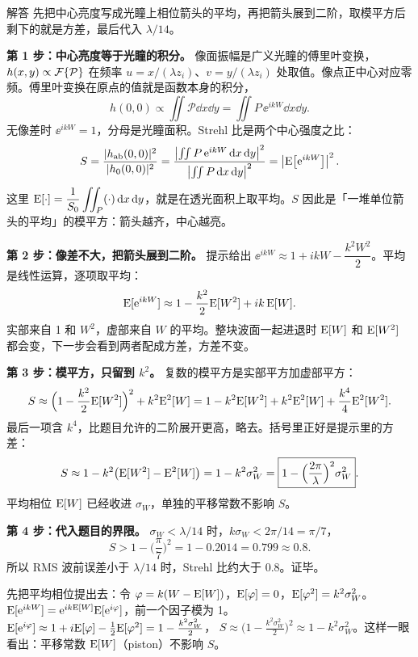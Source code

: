\begin{exam}{解答}
先把中心亮度写成光瞳上相位箭头的平均，再把箭头展到二阶，取模平方后剩下的就是方差，最后代入 $\lambda/14$。

\textbf{第 1 步：中心亮度等于光瞳的积分。}
像面振幅是广义光瞳的傅里叶变换，$h(x,y)\propto\mathcal{F}\{\mathcal P\}$ 在频率 $u=x/(\lambda z_i)$、$v=y/(\lambda z_i)$ 处取值。像点正中心对应零频。傅里叶变换在原点的值就是函数本身的积分，
\[
h(0,0)\propto\iint\mathcal P\dd x\dd y=\iint P\,\ee^{ikW}\dd x\dd y .
\]
无像差时 $\ee^{ikW}=1$，分母是光瞳面积。Strehl 比是两个中心强度之比：
\[
S=\frac{|h_{\text{ab}}(0,0)|^2}{|h_0(0,0)|^2}
=\frac{\left|\iint P\,\mathrm{e}^{ikW}\,\mathrm{d} x\,\mathrm{d} y\right|^2}{\left|\iint P\,\mathrm{d} x\,\mathrm{d} y\right|^2}
=\left|\mathrm{E}\!\left[\mathrm{e}^{ikW}\right]\right|^2 .
\]
这里 $\mathrm{E}[\cdot]=\dfrac1{S_0}\displaystyle\iint_P(\cdot)\,\mathrm{d} x\,\mathrm{d} y$，就是在透光面积上取平均。$S$ 因此是「一堆单位箭头的平均」的模平方：箭头越齐，中心越亮。

\textbf{第 2 步：像差不大，把箭头展到二阶。}
提示给出 $\ee^{ikW}\approx1+ikW-\dfrac{k^2W^2}{2}$。平均是线性运算，逐项取平均：
\[
\mathrm{E}[\mathrm{e}^{ikW}]\approx1-\frac{k^2}{2}\mathrm{E}[W^2]+ik\,\mathrm{E}[W] .
\]
实部来自 1 和 $W^2$，虚部来自 $W$ 的平均。整块波面一起进退时 $\mathrm{E}[W]$ 和 $\mathrm{E}[W^2]$ 都会变，下一步会看到两者配成方差，方差不变。

\textbf{第 3 步：模平方，只留到 $k^2$。}
复数的模平方是实部平方加虚部平方：
\[
S\approx\Big(1-\frac{k^2}{2}\mathrm{E}[W^2]\Big)^2+k^2\mathrm{E}^2[W]
=1-k^2\mathrm{E}[W^2]+k^2\mathrm{E}^2[W]+\frac{k^4}{4}\mathrm{E}^2[W^2] .
\]
最后一项含 $k^4$，比题目允许的二阶展开更高，略去。括号里正好是提示里的方差：
\[
S\approx1-k^2\big(\mathrm{E}[W^2]-\mathrm{E}^2[W]\big)=1-k^2\sigma_W^2
=\boxed{1-\Big(\frac{2\pi}{\lambda}\Big)^2\sigma_W^2} .
\]
平均相位 $\mathrm{E}[W]$ 已经收进 $\sigma_W$，单独的平移常数不影响 $S$。

\textbf{第 4 步：代入题目的界限。}
$\sigma_W<\lambda/14$ 时，$k\sigma_W<2\pi/14=\pi/7$，
\[
S>1-\Big(\frac{\pi}{7}\Big)^2=1-0.2014=0.799\approx0.8 .
\]
所以 RMS 波前误差小于 $\lambda/14$ 时，Strehl 比约大于 0.8。证毕。
\end{exam}

\begin{idea}
先把平均相位提出去：令 $\varphi=k(W-\mathrm{E}[W])$，$\mathrm{E}[\varphi]=0$，$\mathrm{E}[\varphi^2]=k^2\sigma_W^2$。
$\mathrm{E}[\mathrm{e}^{ikW}]=\mathrm{e}^{ik\mathrm{E}[W]}\mathrm{E}[\mathrm{e}^{i\varphi}]$，前一个因子模为 1。
$\mathrm{E}[\mathrm{e}^{i\varphi}]\approx1+i\mathrm{E}[\varphi]-\frac12\mathrm{E}[\varphi^2]=1-\frac{k^2\sigma_W^2}{2}$，
$S\approx\big(1-\frac{k^2\sigma_W^2}{2}\big)^2\approx1-k^2\sigma_W^2$。这样一眼看出：平移常数 $\mathrm{E}[W]$（piston）不影响 $S$。
\end{idea}

